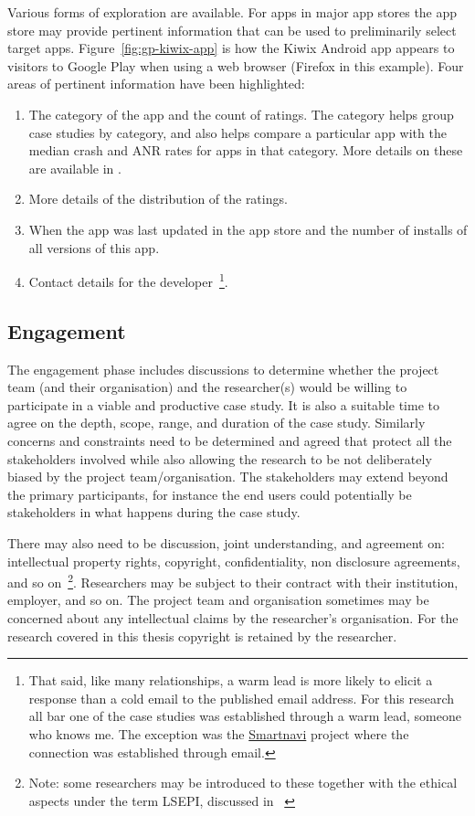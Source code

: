 Various forms of exploration are available. For apps in major app stores the app store may provide pertinent information that can be used to preliminarily select target apps. Figure~\ref{fig:gp-kiwix-app} is how the Kiwix Android app appears to visitors to Google Play when using a web browser (Firefox in this example). Four areas of pertinent information have been highlighted:

\begin{enumerate}[label=(\alph*)]
    \itemsep0em
    \item The category of the app and the count of ratings. The category helps group case studies by category, and also helps compare a particular app with the median crash and ANR rates for apps in that category. More details on these are available in .
    \item More details of the distribution of the ratings.
    \item When the app was last updated in the app store and the number of installs of all versions of this app.
    \item Contact details for the developer~\footnote{That said, like many relationships, a warm lead is more likely to elicit a response than a cold email to the published email address. For this research all bar one of the case studies was established through a warm lead, someone who knows me. The exception was the \href{https://github.com/Phantast/smartnavi}{Smartnavi} project where the connection was established through email.}.
\end{enumerate}

\clearpage
\subsection{Engagement}
The engagement phase includes discussions to determine whether the project team (and their organisation) and the researcher(s) would be willing to participate in a viable and productive case study. It is also a suitable time to agree on the depth, scope, range, and duration of the case study. Similarly concerns and constraints need to be determined and agreed that protect all the stakeholders involved while also allowing the research to be not deliberately biased by the project team/organisation. The stakeholders may extend beyond the primary participants, for instance the end users could potentially be stakeholders in what happens during the case study.

There may also need to be discussion, joint understanding, and agreement on: intellectual property rights, copyright, confidentiality, non disclosure agreements, and so on~\footnote{Note: some researchers may be introduced to these together with the ethical aspects under the term LSEPI, discussed in ~\citet{brooke2018__becoming_professional_a_university_perspective}}. Researchers may be subject to their contract with their institution, employer, and so on. The project team and organisation sometimes may be concerned about any intellectual claims by the researcher's organisation. For the research covered in this thesis copyright is retained by the researcher.

